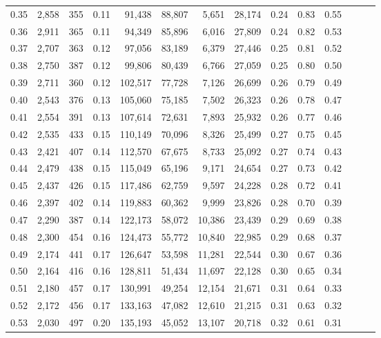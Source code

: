 \begin{tabular}{rrrrrrrrrrrrrr}
0.35 &  2,858 &  355 &  0.11 &   91,438 &   88,807 &   5,651 &  28,174 &  0.24 &  0.83 &      0.55 \\
0.36 &  2,911 &  365 &  0.11 &   94,349 &   85,896 &   6,016 &  27,809 &  0.24 &  0.82 &      0.53 \\
0.37 &  2,707 &  363 &  0.12 &   97,056 &   83,189 &   6,379 &  27,446 &  0.25 &  0.81 &      0.52 \\
0.38 &  2,750 &  387 &  0.12 &   99,806 &   80,439 &   6,766 &  27,059 &  0.25 &  0.80 &      0.50 \\
0.39 &  2,711 &  360 &  0.12 &  102,517 &   77,728 &   7,126 &  26,699 &  0.26 &  0.79 &      0.49 \\
0.40 &  2,543 &  376 &  0.13 &  105,060 &   75,185 &   7,502 &  26,323 &  0.26 &  0.78 &      0.47 \\
0.41 &  2,554 &  391 &  0.13 &  107,614 &   72,631 &   7,893 &  25,932 &  0.26 &  0.77 &      0.46 \\
0.42 &  2,535 &  433 &  0.15 &  110,149 &   70,096 &   8,326 &  25,499 &  0.27 &  0.75 &      0.45 \\
0.43 &  2,421 &  407 &  0.14 &  112,570 &   67,675 &   8,733 &  25,092 &  0.27 &  0.74 &      0.43 \\
0.44 &  2,479 &  438 &  0.15 &  115,049 &   65,196 &   9,171 &  24,654 &  0.27 &  0.73 &      0.42 \\
0.45 &  2,437 &  426 &  0.15 &  117,486 &   62,759 &   9,597 &  24,228 &  0.28 &  0.72 &      0.41 \\
0.46 &  2,397 &  402 &  0.14 &  119,883 &   60,362 &   9,999 &  23,826 &  0.28 &  0.70 &      0.39 \\
0.47 &  2,290 &  387 &  0.14 &  122,173 &   58,072 &  10,386 &  23,439 &  0.29 &  0.69 &      0.38 \\
0.48 &  2,300 &  454 &  0.16 &  124,473 &   55,772 &  10,840 &  22,985 &  0.29 &  0.68 &      0.37 \\
0.49 &  2,174 &  441 &  0.17 &  126,647 &   53,598 &  11,281 &  22,544 &  0.30 &  0.67 &      0.36 \\
0.50 &  2,164 &  416 &  0.16 &  128,811 &   51,434 &  11,697 &  22,128 &  0.30 &  0.65 &      0.34 \\
0.51 &  2,180 &  457 &  0.17 &  130,991 &   49,254 &  12,154 &  21,671 &  0.31 &  0.64 &      0.33 \\
0.52 &  2,172 &  456 &  0.17 &  133,163 &   47,082 &  12,610 &  21,215 &  0.31 &  0.63 &      0.32 \\
0.53 &  2,030 &  497 &  0.20 &  135,193 &   45,052 &  13,107 &  20,718 &  0.32 &  0.61 &      0.31 \\

\end{tabular}
